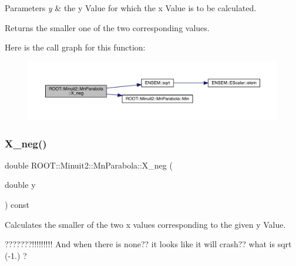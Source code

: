 \begin{DoxyParams}{Parameters}
{\em y} & the y Value for which the x Value is to be calculated.\\
\hline
\end{DoxyParams}
\begin{DoxyReturn}{Returns}
the smaller one of the two corresponding values. 
\end{DoxyReturn}
Here is the call graph for this function\+:
\nopagebreak
\begin{figure}[H]
\begin{center}
\leavevmode
\includegraphics[width=350pt]{db/d7d/classROOT_1_1Minuit2_1_1MnParabola_a16f7f02dd1cb070e89fb007331066ee3_cgraph}
\end{center}
\end{figure}
\mbox{\label{classROOT_1_1Minuit2_1_1MnParabola_a16f7f02dd1cb070e89fb007331066ee3}} 
\subsubsection{\texorpdfstring{X\_neg()}{X\_neg()}\hspace{0.1cm}{\footnotesize\ttfamily [3/3]}}
{\footnotesize\ttfamily double R\+O\+O\+T\+::\+Minuit2\+::\+Mn\+Parabola\+::\+X\+\_\+neg (\begin{DoxyParamCaption}\item[{double}]{y }\end{DoxyParamCaption}) const\hspace{0.3cm}{\ttfamily [inline]}}

Calculates the smaller of the two x values corresponding to the given y Value.

???????!!!!!!!!! And when there is none?? it looks like it will crash?? what is sqrt (-\/1.) ?


